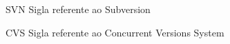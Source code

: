 \begin{siglas}
  \item[SVN] Sigla referente ao Subversion
  \item[CVS] Sigla referente ao Concurrent Versions System


\end{siglas}
